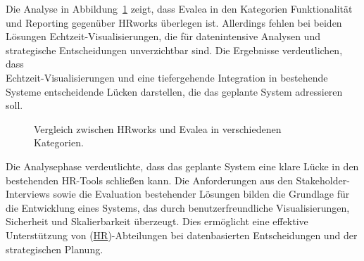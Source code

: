 Die Analyse in Abbildung~\ref{fig:hrworks_evalea_comparison} zeigt, dass Evalea in den Kategorien Funktionalität \\und Reporting gegenüber HRworks überlegen ist. Allerdings fehlen bei beiden Lösungen Echtzeit-Visualisierungen, die für datenintensive Analysen und strategische Entscheidungen unverzichtbar sind. Die Ergebnisse verdeutlichen, dass \\Echtzeit-Visualisierungen und eine tiefergehende Integration in bestehende Systeme entscheidende Lücken darstellen, die das geplante System adressieren soll.

\begin{figure}[h!]
\centering
{} \caption{Vergleich zwischen HRworks und Evalea in verschiedenen Kategorien.} \label{fig:hrworks_evalea_comparison} \end{figure}

Die Analysephase verdeutlichte, dass das geplante System eine klare Lücke in den bestehenden HR-Tools schließen kann. Die Anforderungen aus den Stakeholder-Interviews sowie die Evaluation bestehender Lösungen bilden die Grundlage für die Entwicklung eines Systems, das durch benutzerfreundliche Visualisierungen, Sicherheit und Skalierbarkeit überzeugt. Dies ermöglicht eine effektive Unterstützung von (\hyperref[abkuerzungen]{HR})-Abteilungen bei datenbasierten Entscheidungen und der strategischen Planung.